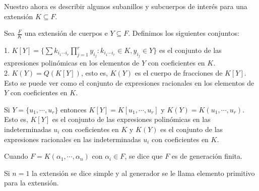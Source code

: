 Nuestro ahora es describir algunos subanillos y subcuerpos de interés para una extensión $K \subseteq F$. 

\begin{definition}
Sea $\frac{F}{K}$ una extensión de cuerpos e $Y \subseteq F$. Definimos los siguientes conjuntos:

1. $K[Y] = \{\sum k_{i_1 \cdots i_r} \prod_{j = 1}^r y_{i_j}:k_{i_1 \cdots i_r} \in K, y_{i_j} \in Y\}$ es el conjunto de las expresiones polinómicas en los elementos de $Y$ con coeficientes en $K$.\\
2. $K(Y) = Q(K[Y])$, esto es, $K(Y)$ es el cuerpo de fracciones de $K[Y]$. Esto se puede ver como el conjunto de expresiones racionales en los elementos de $Y$ con coeficientes en $K$.  
\end{definition}

\begin{definition}
Si $Y = \{u_1,\cdots,u_r\}$ entonces $K[Y] = K[u_1,\cdots,u_r]$ y $K(Y) = K(u_1,\cdots,u_r)$. Esto es, $K[Y]$ es el conjunto de las expresiones polinómicas en las indeterminadas $u_i$ con coeficientes en $K$ y $K(Y)$ es el conjunto de las expresiones racionales en las indeterminadas $u_i$ con coeficientes en $K$.
\end{definition}

\begin{definition}
	Cuando $F = K(\alpha_1,\cdots,\alpha_n)$ con $\alpha_i \in F$, se dice que $F$ es de generación finita. 
	
	Si $n = 1$ la extensión se dice simple y al generador se le llama elemento primitivo para la extensión. 
\end{definition}

